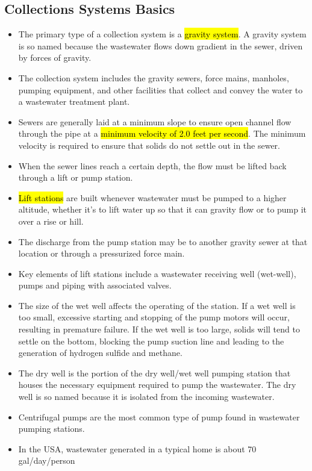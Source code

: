 \subsection{Collections Systems Basics}
	\begin{itemize}
\item The primary type of a collection system is a \hl{gravity system}. A gravity system is so named because the wastewater flows down gradient in the sewer, driven by forces of gravity. 
\item The collection system includes the gravity sewers, force mains, manholes, pumping equipment, and other facilities that collect and convey the water to a wastewater treatment plant. 
\item Sewers are generally laid at a minimum slope to ensure open channel flow through the pipe at a \hl{minimum velocity of 2.0 feet per second}. The minimum velocity is required to ensure that solids do not settle out in the sewer.  
\item When the sewer lines reach a certain depth, the flow must be lifted back through a lift or pump station.  
\item \hl{Lift stations} are built whenever wastewater must be pumped to a higher altitude, whether it's to lift water up so that it can gravity flow or to pump it over a rise or hill.  
\item The discharge from the pump station may be to another gravity sewer at that location or through a pressurized force main. 
\item Key elements of lift stations include a wastewater receiving well (wet-well), pumps and piping with associated valves.
\item The size of the wet well affects the operating of the station. If a wet well is too small, excessive starting and stopping of the pump motors will occur, resulting in premature failure. If the wet well is too large, solids will tend to settle on the bottom, blocking the pump suction line and leading to the generation of hydrogen sulfide and methane.
\item The dry well is the portion of the dry well/wet well pumping station that houses the necessary equipment required to pump the wastewater. The dry well is so named because it is isolated from the incoming wastewater.
\item Centrifugal pumps are the most common type of pump found in wastewater pumping stations. 
\item In the USA, wastewater generated in a typical home is about 70 gal/day/person
\end{itemize}

